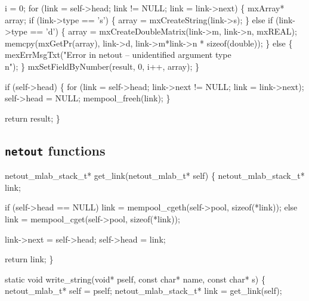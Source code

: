     i = 0;
    for (link = self->head; link != NULL; link = link->next) \{
        mxArray* array;
        if (link->type == 's') \{
            array = mxCreateString(link->s);
        \} else if (link->type == 'd') \{
            array = mxCreateDoubleMatrix(link->m, link->n, mxREAL);
            memcpy(mxGetPr(array), link->d, link->m*link->n * sizeof(double));
        \} else \{
            mexErrMsgTxt("Error in netout -- unidentified argument type\\n");
        \}
        mxSetFieldByNumber(result, 0, i++, array);
    \}

    if (self->head) \{
        for (link = self->head; link->next != NULL; link = link->next);
        self->head = NULL;
        mempool_freeh(link);
    \}

    return result;
\}

\nwendcode{}\nwdocspar


\subsection{{\tt{}netout} functions}

\nwenddocs{}\plusendmoddef
netout_mlab_stack_t* get_link(netout_mlab_t* self)
\{
    netout_mlab_stack_t* link;

    if (self->head == NULL)
        link = mempool_cgeth(self->pool, sizeof(*link));
    else
        link = mempool_cget(self->pool, sizeof(*link));

    link->next = self->head;
    self->head = link;

    return link;
\}

\nwendcode{}\nwdocspar

\nwenddocs{}\plusendmoddef
static void write_string(void* pself, const char* name, const char* s)
\{
    netout_mlab_t*       self = pself;
    netout_mlab_stack_t* link = get_link(self);

